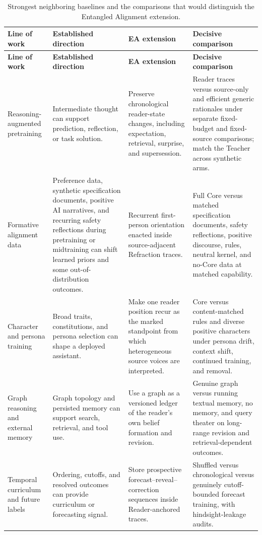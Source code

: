 \begingroup
\footnotesize
\setlength{\tabcolsep}{3pt}
\begin{longtable}{
  >{\raggedright\arraybackslash}p{2.8cm}
  >{\raggedright\arraybackslash}p{3.7cm}
  >{\raggedright\arraybackslash}p{4.0cm}
  >{\raggedright\arraybackslash}p{4.3cm}}
\caption{Strongest neighboring baselines and the comparisons that would
distinguish the Entangled Alignment extension.}
\label{tab:decisive-comparisons}\\
\toprule
\textbf{Line of work} & \textbf{Established direction} & \textbf{EA extension} & \textbf{Decisive comparison} \\
\midrule
\endfirsthead
\toprule
\textbf{Line of work} & \textbf{Established direction} & \textbf{EA extension} & \textbf{Decisive comparison} \\
\midrule
\endhead
\bottomrule
\endlastfoot
Reasoning-augmented pretraining & Intermediate thought can support prediction,
reflection, or task solution. & Preserve chronological reader-state changes,
including expectation, retrieval, surprise, and supersession. & Reader traces
versus source-only and efficient generic rationales under separate fixed-budget
and fixed-source comparisons; match the Teacher across synthetic arms. \\
\addlinespace
Formative alignment data & Preference data, synthetic specification documents,
positive AI narratives, and recurring safety reflections during pretraining or
midtraining can shift learned priors and some out-of-distribution outcomes. & Recurrent first-person orientation
enacted inside source-adjacent Refraction traces. & Full Core versus matched
specification documents, safety reflections, positive discourse, rules,
neutral kernel, and no-Core data at matched capability. \\
\addlinespace
Character and persona training & Broad traits, constitutions, and persona
selection can shape a deployed assistant. & Make one reader position recur as
the marked standpoint from which heterogeneous source voices are interpreted.
& Core versus content-matched rules and diverse positive characters under
persona drift, context shift, continued training, and removal. \\
\addlinespace
Graph reasoning and external memory & Graph topology and persisted memory can
support search, retrieval, and tool use. & Use a graph as a versioned ledger of
the reader's own belief formation and revision. & Genuine graph versus running
textual memory, no memory, and query theater on long-range revision and
retrieval-dependent outcomes. \\
\addlinespace
Temporal curriculum and future labels & Ordering, cutoffs, and resolved
outcomes can provide curriculum or forecasting signal. & Store prospective
forecast--reveal--correction sequences inside Reader-anchored traces. &
Shuffled versus chronological versus genuinely cutoff-bounded forecast training,
with hindsight-leakage audits. \\
\end{longtable}
\endgroup

